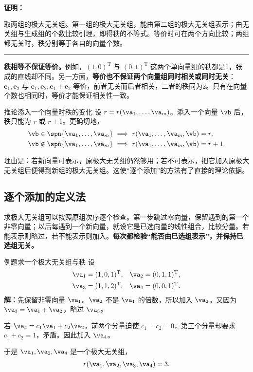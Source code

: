 \documentclass[a4paper,12pt,twoside,openany,fontset=none]{ctexbook}
\newenvironment{corollary}[1][]{\begin{thmBox}{推论}{#1}}{\end{thmBox}}
\newcounter{example}[chapter]
\newenvironment{example}[1][]{\begin{exBox}{例题}{#1}}{\end{exBox}}
\renewenvironment{proof}{
    \par\vspace{0.5em}\noindent
    \textbf{\color{LogicColor} 证明：}
}{
    \hfill \textcolor{LogicColor}{\rule{0.6em}{0.6em}} \par
}
\numberwithin{equation}{chapter}
\begin{document}
\begin{proof}
取两组的极大无关组。第一组的极大无关组，能由第二组的极大无关组表示；由无关组与生成组的个数比较引理，即得秩的不等式。等价时可在两个方向比较；两组都无关时，秩分别等于各自的向量个数。
\end{proof}

\textbf{秩相等不保证等价。}例如，$(1,0)^{\mathrm T}$ 与 $(0,1)^{\mathrm T}$ 这两个单向量组的秩都是1，张成的直线却不同。另一方面，\textbf{等价也不保证两个向量组同时相关或同时无关}：$\boldsymbol{e}_1,\boldsymbol{e}_2$ 与 $\boldsymbol{e}_1,\boldsymbol{e}_2,\boldsymbol{e}_1+\boldsymbol{e}_2$ 等价，前者无关而后者相关，二者的秩同为2。只有在向量个数也相同时，等价才能保证相关性一致。

\begin{corollary}[添入一个向量时秩的变化]
设 $r=r(\va_1,\ldots,\va_m)$。添入一个向量 $\vb$ 后，秩只能为 $r$ 或 $r+1$。更确切地，
\[
\begin{aligned}
    \vb\in\spn\{\va_1,\ldots,\va_m\}
       &\ \Longrightarrow\ r(\va_1,\ldots,\va_m,\vb)=r,\\
    \vb\notin\spn\{\va_1,\ldots,\va_m\}
       &\ \Longrightarrow\ r(\va_1,\ldots,\va_m,\vb)=r+1.
\end{aligned}
\]
\end{corollary}

理由是：若新向量可表示，原极大无关组仍然够用；若不可表示，把它加入原极大无关组后便得到新组的极大无关组。这使“逐个添加”的方法有了直接的理论依据。

\subsection*{逐个添加的定义法}

求极大无关组可以按照原组次序逐个检查。第一步跳过零向量，保留遇到的第一个非零向量；以后每遇到一个新向量，就设它是已选向量的线性组合，比较分量。若能表示则略过，若不能表示则加入。\textbf{每次都检验“能否由已选组表示”，并保持已选组无关。}

\begin{example}[求一个极大无关组与秩]
设
\[
\begin{aligned}
    \va_1&=(1,0,1)^{\mathrm T},&\va_2&=(0,1,1)^{\mathrm T},\\
    \va_3&=(1,1,2)^{\mathrm T},&\va_4&=(0,0,1)^{\mathrm T}.
\end{aligned}
\]
\textbf{解：}先保留非零向量 $\va_1$。$\va_2$ 不是 $\va_1$ 的倍数，所以加入 $\va_2$。又因为 $\va_3=\va_1+\va_2$，略过 $\va_3$。

若 $\va_4=c_1\va_1+c_2\va_2$，前两个分量迫使 $c_1=c_2=0$，第三个分量却要求 $c_1+c_2=1$，矛盾。因此加入 $\va_4$。

于是 $\va_1,\va_2,\va_4$ 是一个极大无关组，
\[
    r(\va_1,\va_2,\va_3,\va_4)=3.
\]
\end{example}
\end{document}

